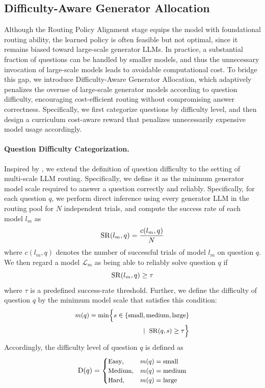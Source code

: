 \subsection{Difficulty-Aware Generator Allocation}
\label{sec:stage2}
Although the Routing Policy Alignment stage equips the model with foundational routing ability, the learned policy is often feasible but not optimal, since it remains biased toward large-scale generator LLMs. In practice, a substantial fraction of questions can be handled by smaller models, and thus the unnecessary invocation of large-scale models leads to avoidable computational cost. To bridge this gap, we introduce Difficulty-Aware Generator Allocation, which adaptively penalizes the overuse of large-scale generator models according to question difficulty, encouraging cost-efficient routing without compromising answer correctness. Specifically, we first categorize questions by difficulty level, and then design a curriculum cost-aware reward that penalizes unnecessarily expensive model usage accordingly.

\paragraph{Question Difficulty Categorization.} Inspired by \citet{curriculumreinforcementlearningeasy}, we extend the definition of question difficulty to the setting of multi-scale LLM routing. Specifically, we define it as the minimum generator model scale required to answer a question correctly and reliably. Specifically, for each question $q$, we perform direct inference using every generator LLM in the routing pool for $N$ independent trials, and compute the success rate of each model $l_m$ as
\[
\small
\mathrm{SR}(l_m, q)=\frac{c(l_m,q)}{N}
\]
where $c(l_m,q)$ denotes the number of successful trials of model $l_m$ on question $q$. We then regard a model $\mathcal{L}_m$ as being able to reliably solve question $q$ if
\[
\small
\mathrm{SR}(l_m, q)\ge \tau
\]
where $\tau$ is a predefined success-rate threshold. Further, we define the difficulty of question $q$ by the minimum model scale that satisfies this condition:
\[
\small
\begin{aligned}
m(q)=\min \Bigl\{ s \in \{\text{small},\text{medium},\text{large}\} \\
\mid\ \mathrm{SR}(q,s)\ge \tau
\Bigr\}
\end{aligned}
\]
Accordingly, the difficulty level of question $q$ is defined as
\[
\small
\mathrm{D}(q)=
\begin{cases}
\text{Easy}, & m(q)=\text{small}\\
\text{Medium}, & m(q)=\text{medium}\\
\text{Hard}, & m(q)=\text{large}
\end{cases}
\]
